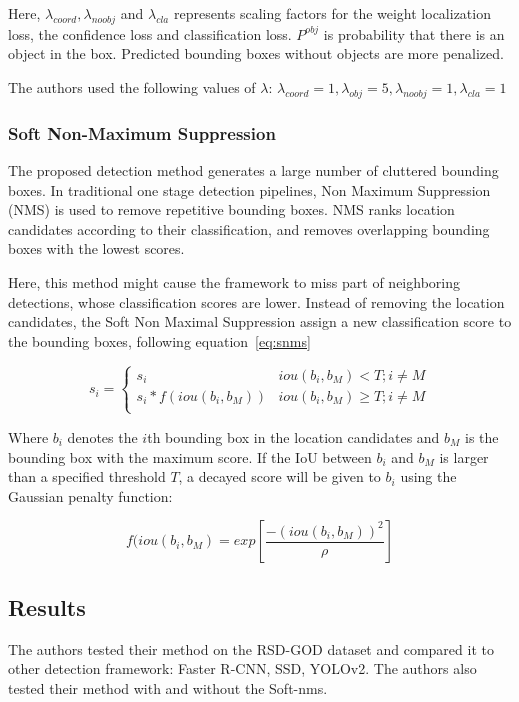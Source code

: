 Here, $\lambda_{coord}, \lambda_{noobj}$ and $\lambda_{cla}$ represents scaling factors for the weight localization loss, the confidence loss and classification loss. $P^{obj}$ is probability that there is an object in the box. Predicted bounding boxes without objects are more penalized. 

The authors used the following values of $\lambda$: $\lambda_{coord} = 1, \lambda_{obj} = 5, \lambda_{noobj} = 1, \lambda_{cla} = 1$
\subsubsection{Soft Non-Maximum Suppression}

The proposed detection method generates a large number of cluttered bounding boxes. In traditional one stage detection pipelines, Non Maximum Suppression (NMS) is used to remove repetitive bounding boxes. NMS ranks location candidates according to their classification, and removes overlapping bounding boxes with the lowest scores. 

Here, this method might cause the framework to miss part of neighboring detections, whose classification scores are lower. Instead of removing the location candidates, the Soft Non Maximal Suppression assign a new classification score to the bounding boxes, following equation~\ref{eq:snms}

\begin{equation}\label{eq:snms}
	s_i =
	      \begin{cases}
		      s_i & iou(b_i, b_M) < T; i \neq M\\
		      s_i * f(iou(b_i, b_M)) & iou(b_i, b_M) \geq T; i \neq M\\
	      \end{cases}  
\end{equation}

Where $b_i$ denotes the $i$th bounding box in the location candidates and $b_M$ is the bounding box with the maximum score. If the IoU between $b_i$ and $b_M$ is larger than a specified threshold $T$, a decayed score will be given to $b_i$ using the Gaussian penalty function:

\begin{equation}
	f(iou(b_i, b_M) = exp[\frac{-(iou(b_i, b_M))^2}{\rho}]
\end{equation}

\subsection{Results}
The authors tested their method on the RSD-GOD dataset and compared it to other detection framework: Faster R-CNN\cite{FasterRCNN}, SSD\cite{ssd}, YOLOv2\cite{yolov9000}. The authors also tested their method with and without the Soft-\gls{nms}.

